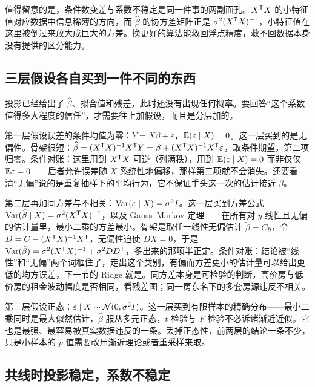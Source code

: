 值得留意的是，条件数变差与系数不稳定是同一件事的两副面孔。\(X^{\mathsf{T}}X\) 的小特征值对应数据中信息稀薄的方向，而 \(\widehat\beta\) 的协方差矩阵正是 \(\sigma^2(X^{\mathsf{T}}X)^{-1}\)，小特征值在这里被倒过来放大成巨大的方差。换更好的算法能救回浮点精度，救不回数据本身没有提供的区分能力。

\subsection{三层假设各自买到一件不同的东西}

投影已经给出了 \(\widehat\beta\)、拟合值和残差，此时还没有出现任何概率。要回答``这个系数值得多大程度的信任''，才需要往上加假设，而且是分层加的。

第一层假设误差的条件均值为零：\(Y=X\beta+\varepsilon\)，\(\mathbb{E}(\varepsilon\mid X)=0\)。这一层买到的是无偏性。骨架很短：\(\widehat\beta=(X^{\mathsf{T}}X)^{-1}X^{\mathsf{T}}Y=\beta+(X^{\mathsf{T}}X)^{-1}X^{\mathsf{T}}\varepsilon\)，取条件期望，第二项归零。条件对账：这里用到 \(X^{\mathsf{T}}X\) 可逆（列满秩），用到 \(\mathbb{E}(\varepsilon\mid X)=0\) 而非仅仅 \(\mathbb{E}\varepsilon=0\)——后者允许误差随 \(X\) 系统性地偏移，那样第二项就不会消失。还要看清``无偏''说的是重复抽样下的平均行为，它不保证手头这一次的估计接近 \(\beta\)。

第二层再加同方差与不相关：\(\operatorname{Var}(\varepsilon\mid X)=\sigma^2I\)。这一层买到方差公式 \(\operatorname{Var}(\widehat\beta\mid X)=\sigma^2(X^{\mathsf{T}}X)^{-1}\)，以及 Gauss--Markov 定理——在所有对 \(y\) 线性且无偏的估计量里，最小二乘的方差最小。骨架是取任一线性无偏估计 \(\tilde\beta=Cy\)，令 \(D=C-(X^{\mathsf{T}}X)^{-1}X^{\mathsf{T}}\)，无偏性迫使 \(DX=0\)，于是 \(\operatorname{Var}(\tilde\beta)=\sigma^2(X^{\mathsf{T}}X)^{-1}+\sigma^2DD^{\mathsf{T}}\)，多出来的那项半正定。条件对账：结论被``线性''和``无偏''两个词框住了，走出这个类别，有偏而方差更小的估计量可以给出更低的均方误差，下一节的 Ridge 就是。同方差本身是可检验的判断，高价房与低价房的租金波动幅度是否相同，看残差图；同一房东名下的多套房源违反不相关。

第三层假设正态：\(\varepsilon\mid X\sim\mathcal N(0,\sigma^2I)\)。这一层买到有限样本的精确分布——最小二乘同时是最大似然估计，\(\widehat\beta\) 服从多元正态，\(t\) 检验与 \(F\) 检验不必诉诸渐近近似。它也是最强、最容易被真实数据违反的一条。丢掉正态性，前两层的结论一条不少，只是小样本的 \(p\) 值需要改用渐近理论或者重采样来取。

\subsection{共线时投影稳定，系数不稳定}

